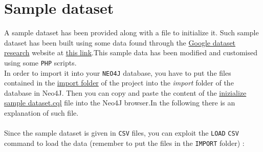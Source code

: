 \documentclass{article}
\begin{document}
\section{Sample dataset}\label{import dataset}
A sample dataset has been provided along with a file to initialize it. Such sample dataset has been built using some data found through the \href{https://datasetsearch.research.google.com}{Google dataset research} website at \href{https://www.kaggle.com/aleanfigeno/contact-tracing-application-sample-datasets/tasks}{this link}.This sample data has been modified and customised using some \verb|PHP| scripts.\\ In order to import it into your \verb |NEO4J| database, you have to put the files contained in the \href{https://github.com/filippolazzati/smbud/tree/main/graph\%20databases/sample\%20dataset\%20and\%20code/import}{import folder} of the project into the \textit{import} folder of the database in Neo4J. Then you can copy and paste the content of the \href{https://github.com/filippolazzati/smbud/blob/main/graph\%20databases/sample\%20dataset\%20and\%20code/inizialize\%20sample\%20dataset.cql}{inizialize sample dataset.cql} file into the Neo4J browser.In the following there is an explanation of such file.\\ \\
Since the sample dataset is given in \verb |CSV| files, you can exploit the \verb |LOAD| \verb |CSV| command to load the data (remember to put the files in the \verb |IMPORT| folder) :
\end{document}
